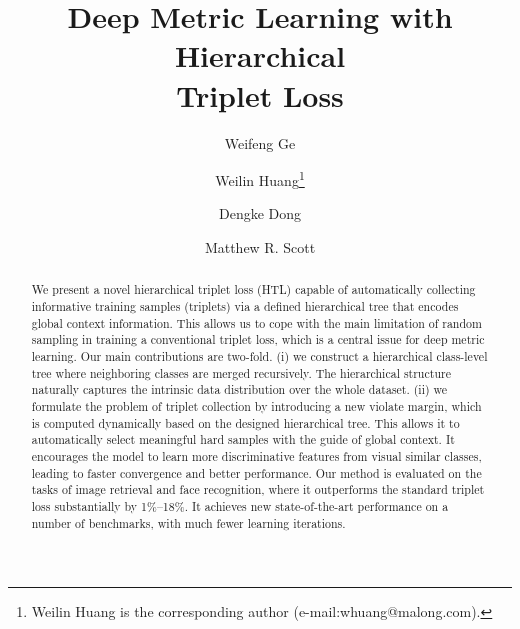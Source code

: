 \documentclass[runningheads]{llncs}
\begin{document}
\title{Deep Metric Learning with Hierarchical \\ Triplet Loss}

\author{Weifeng Ge \and
Weilin Huang\thanks{Weilin Huang is the corresponding author (e-mail:whuang@malong.com).} \and
Dengke Dong \and Matthew R. Scott}

\maketitle              \begin{abstract}
We present a novel hierarchical triplet loss (HTL) capable of automatically collecting informative training samples (triplets) via a defined hierarchical tree that encodes global context information. This allows us to cope with the main limitation of random sampling in training a conventional triplet loss, which is a central issue for deep metric learning. Our main contributions are two-fold. (i) we construct a hierarchical class-level tree where neighboring classes are merged recursively. The hierarchical structure naturally captures the intrinsic data distribution over the whole dataset. (ii) we formulate the problem of triplet collection by introducing a new violate margin, which is computed dynamically based on the designed hierarchical tree. This allows it to automatically select meaningful hard samples with the guide of global context. It encourages the model to learn more discriminative features from visual similar classes, leading to faster convergence and better performance.
Our method is evaluated on the tasks of image retrieval and face recognition, where it outperforms the standard triplet loss substantially by 1\%–18\%. It achieves new state-of-the-art performance on a number of benchmarks, with much fewer learning iterations.



\end{abstract}
\end{document}
